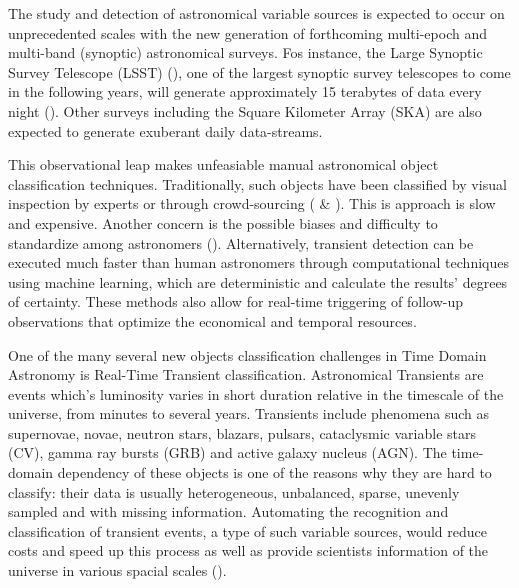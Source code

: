
The study and detection of astronomical variable sources is expected
to occur on unprecedented scales with the new generation of
forthcoming multi-epoch and multi-band (synoptic) astronomical
surveys. 
Fos instance, the Large Synoptic Survey Telescope (LSST)
(\cite{0805.2366}), one of the largest synoptic survey telescopes to
come in the following years, will generate approximately 15 terabytes
of data every night (\cite{1512.07914}).  
Other surveys including the Square Kilometer Array (SKA) are also expected
to generate exuberant daily data-streams. 

This observational leap makes unfeasiable manual astronomical object
classification techniques.  
Traditionally, such objects have been classified by visual inspection
by experts or through crowd-sourcing
(\cite{1011.2199} \& \cite{0708.2750}). 
This is approach is slow and expensive.
Another concern is the possible biases and difficulty to standardize among 
astronomers (\cite{1104.3142}). 
Alternatively, transient detection can be executed much faster than
human astronomers through computational techniques using machine
learning, 
which are deterministic and calculate the results' degrees of
certainty. 
These methods also allow for real-time triggering of follow-up
observations that optimize the economical and temporal resources. 
 

One of the many several new objects classification challenges in Time Domain Astronomy is Real-Time Transient classification. Astronomical Transients are events which's luminosity varies in short duration relative in the timescale of the universe, from minutes to several years. Transients include phenomena such as supernovae, novae, neutron stars, blazars, pulsars, cataclysmic variable stars (CV), gamma ray bursts (GRB) and active galaxy nucleus (AGN). The time-domain dependency of these objects is one of the reasons why they are hard to classify: their data is usually heterogeneous, unbalanced, sparse, unevenly sampled and with missing information. Automating the recognition and classification of transient events, a type of such variable sources, would reduce costs and speed up this process as well as provide scientists information of the universe in various spacial scales (\cite{2011arXiv1110.4655D}).

